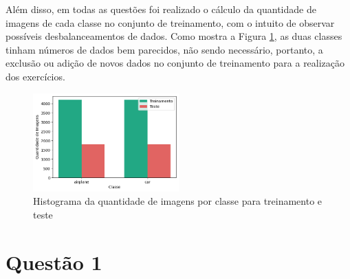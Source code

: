 \documentclass[]{abntex2}
\begin{document}
Além disso, em todas as questões foi realizado o cálculo da quantidade de imagens de cada classe no conjunto de treinamento, com o intuito de observar possíveis desbalanceamentos de dados. Como mostra a Figura \ref{fig:distri}, as duas classes tinham números de dados bem parecidos, não sendo necessário, portanto, a exclusão ou adição de novos dados no conjunto de treinamento para a realização dos exercícios.

\begin{figure}[H]
    \centering 
    \includegraphics[width=0.5\textwidth]{imgs/introduction/distri.png}
    \caption{Histograma da quantidade de imagens por classe para treinamento e teste}
    \label{fig:distri} %
\end{figure}




\section*{\textbf{Questão 1}}
\end{document}
